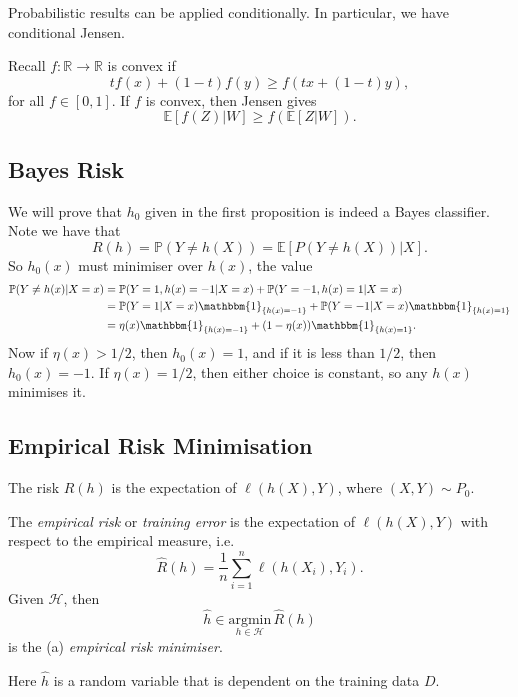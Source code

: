 \documentclass[12pt]{article}
\begin{document}
Probabilistic results can be applied conditionally. In particular, we have conditional Jensen.

Recall $f : \mathbb{R}\to \mathbb{R}$ is convex if
\[
t f(x) + (1-t)f(y) \geq f(tx + (1-t)y),
\]
for all $f \in [0, 1]$. If $f$ is convex, then Jensen gives
\[
\mathbb{E}[f(Z)|W] \geq f(\mathbb{E}[Z|W]).
\]

\subsection{Bayes Risk}
\label{sub:bay_r}

We will prove that $h_0$ given in the first proposition is indeed a Bayes classifier. Note we have that
\[
R(h) = \mathbb{P}(Y \neq h(X)) = \mathbb{E}[P(Y \neq h(X))|X].
\]
So $h_0(x)$ must minimiser over $h(x)$, the value
\begin{align*}
	\mathbb{P}(Y \neq h(x)|X = x) &= \mathbb{P}(Y = 1, h(x) = -1 | X = x) + \mathbb{P}(Y = -1, h(x) = 1 | X = x) \\
				      &= \mathbb{P}(Y = 1|X = x) \mathbbm{1}_{\{h(x) = -1\}} + \mathbb{P}(Y = -1 | X = x) \mathbbm{1}_{\{h(x) = 1\}} \\
				      &= \eta(x) \mathbbm{1}_{\{h(x) = -1\}} + (1 - \eta(x)) \mathbbm{1}_{\{h(x) = 1\}}.
\end{align*}
Now if $\eta(x) > 1/2$, then $h_0(x) = 1$, and if it is less than $1/2$, then $h_0(x) = -1$. If $\eta(x) = 1/2$, then either choice is constant, so any $h(x)$ minimises it.

\subsection{Empirical Risk Minimisation}
\label{sub:emp_r_min}

The risk $R(h)$ is the expectation of $\ell(h(X), Y)$, where $(X, Y) \sim P_0$.

The \emph{empirical risk} or \emph{training error} is the expectation of $\ell(h(X), Y)$ with respect to the empirical measure, i.e.
\[
\hat R(h) = \frac{1}{n} \sum_{i = 1}^n \ell(h(X_i), Y_i).
\]
Given $\mathcal{H}$, then
\[
	\hat h \in \underset{h \in \mathcal{H}}{\mathrm{argmin}} \,\hat R(h)
\]
is the (a) \emph{empirical risk minimiser}.

Here $\hat h$ is a random variable that is dependent on the training data $D$.
\end{document}
